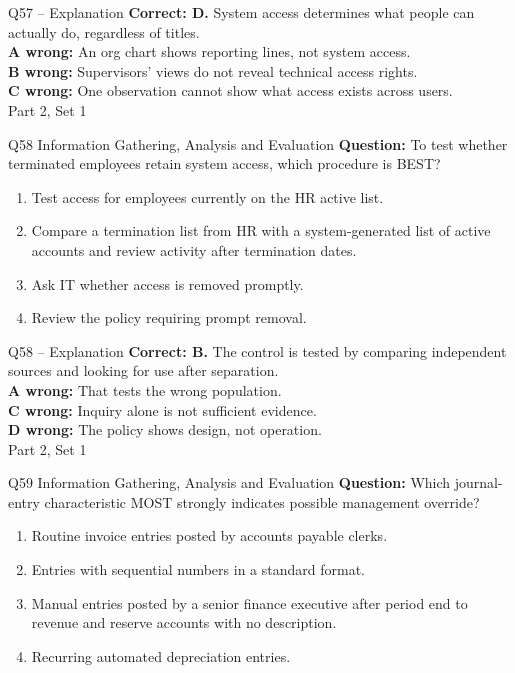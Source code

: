 \documentclass[aspectratio=169,10pt]{beamer}
\begin{document}
\begin{frame}[t]{Q57 -- Explanation}
	\footnotesize
	\textbf{Correct: D.} System access determines what people can actually do, regardless of titles. \\[5pt]
\textbf{A wrong:} An org chart shows reporting lines, not system access. \\[3pt]
\textbf{B wrong:} Supervisors' views do not reveal technical access rights. \\[3pt]
\textbf{C wrong:} One observation cannot show what access exists across users. \\[3pt]
	\vfill {\tiny Part 2, Set 1}
\end{frame}
\begin{frame}[t]{Q58 \hfill {\scriptsize Information Gathering, Analysis and Evaluation}}
	\small
	\textbf{Question:} To test whether terminated employees retain system access, which procedure is BEST?
	\begin{enumerate}[label=\Alph*.,itemsep=1pt,topsep=3pt]
			\item Test access for employees currently on the HR active list.
			\item Compare a termination list from HR with a system-generated list of active accounts and review activity after termination dates.
			\item Ask IT whether access is removed promptly.
			\item Review the policy requiring prompt removal.
	\end{enumerate}
\end{frame}
\begin{frame}[t]{Q58 -- Explanation}
	\footnotesize
	\textbf{Correct: B.} The control is tested by comparing independent sources and looking for use after separation. \\[5pt]
\textbf{A wrong:} That tests the wrong population. \\[3pt]
\textbf{C wrong:} Inquiry alone is not sufficient evidence. \\[3pt]
\textbf{D wrong:} The policy shows design, not operation. \\[3pt]
	\vfill {\tiny Part 2, Set 1}
\end{frame}
\begin{frame}[t]{Q59 \hfill {\scriptsize Information Gathering, Analysis and Evaluation}}
	\small
	\textbf{Question:} Which journal-entry characteristic MOST strongly indicates possible management override?
	\begin{enumerate}[label=\Alph*.,itemsep=1pt,topsep=3pt]
			\item Routine invoice entries posted by accounts payable clerks.
			\item Entries with sequential numbers in a standard format.
			\item Manual entries posted by a senior finance executive after period end to revenue and reserve accounts with no description.
			\item Recurring automated depreciation entries.
	\end{enumerate}
\end{frame}
\end{document}
